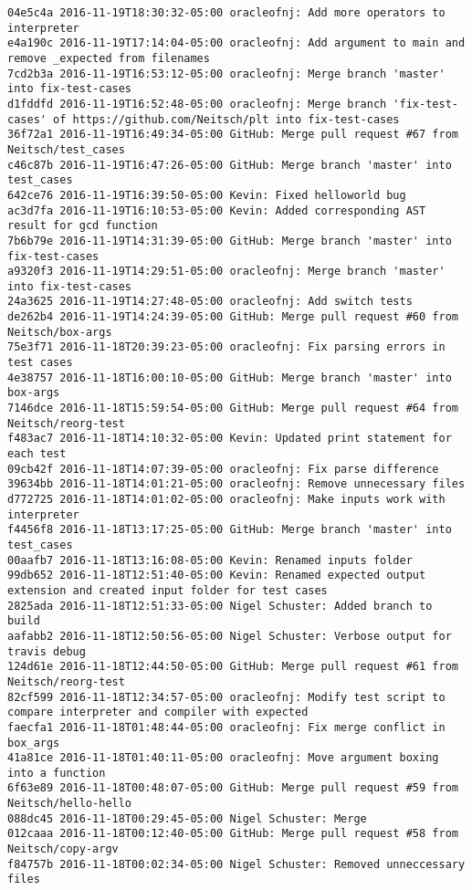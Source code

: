 \begin{lstlisting}
04e5c4a 2016-11-19T18:30:32-05:00 oracleofnj: Add more operators to interpreter
e4a190c 2016-11-19T17:14:04-05:00 oracleofnj: Add argument to main and remove _expected from filenames
7cd2b3a 2016-11-19T16:53:12-05:00 oracleofnj: Merge branch 'master' into fix-test-cases
d1fddfd 2016-11-19T16:52:48-05:00 oracleofnj: Merge branch 'fix-test-cases' of https://github.com/Neitsch/plt into fix-test-cases
36f72a1 2016-11-19T16:49:34-05:00 GitHub: Merge pull request #67 from Neitsch/test_cases
c46c87b 2016-11-19T16:47:26-05:00 GitHub: Merge branch 'master' into test_cases
642ce76 2016-11-19T16:39:50-05:00 Kevin: Fixed helloworld bug
ac3d7fa 2016-11-19T16:10:53-05:00 Kevin: Added corresponding AST result for gcd function
7b6b79e 2016-11-19T14:31:39-05:00 GitHub: Merge branch 'master' into fix-test-cases
a9320f3 2016-11-19T14:29:51-05:00 oracleofnj: Merge branch 'master' into fix-test-cases
24a3625 2016-11-19T14:27:48-05:00 oracleofnj: Add switch tests
de262b4 2016-11-19T14:24:39-05:00 GitHub: Merge pull request #60 from Neitsch/box-args
75e3f71 2016-11-18T20:39:23-05:00 oracleofnj: Fix parsing errors in test cases
4e38757 2016-11-18T16:00:10-05:00 GitHub: Merge branch 'master' into box-args
7146dce 2016-11-18T15:59:54-05:00 GitHub: Merge pull request #64 from Neitsch/reorg-test
f483ac7 2016-11-18T14:10:32-05:00 Kevin: Updated print statement for each test
09cb42f 2016-11-18T14:07:39-05:00 oracleofnj: Fix parse difference
39634bb 2016-11-18T14:01:21-05:00 oracleofnj: Remove unnecessary files
d772725 2016-11-18T14:01:02-05:00 oracleofnj: Make inputs work with interpreter
f4456f8 2016-11-18T13:17:25-05:00 GitHub: Merge branch 'master' into test_cases
00aafb7 2016-11-18T13:16:08-05:00 Kevin: Renamed inputs folder
99db652 2016-11-18T12:51:40-05:00 Kevin: Renamed expected output extension and created input folder for test cases
2825ada 2016-11-18T12:51:33-05:00 Nigel Schuster: Added branch to build
aafabb2 2016-11-18T12:50:56-05:00 Nigel Schuster: Verbose output for travis debug
124d61e 2016-11-18T12:44:50-05:00 GitHub: Merge pull request #61 from Neitsch/reorg-test
82cf599 2016-11-18T12:34:57-05:00 oracleofnj: Modify test script to compare interpreter and compiler with expected
faecfa1 2016-11-18T01:48:44-05:00 oracleofnj: Fix merge conflict in box_args
41a81ce 2016-11-18T01:40:11-05:00 oracleofnj: Move argument boxing into a function
6f63e89 2016-11-18T00:48:07-05:00 GitHub: Merge pull request #59 from Neitsch/hello-hello
088dc45 2016-11-18T00:29:45-05:00 Nigel Schuster: Merge
012caaa 2016-11-18T00:12:40-05:00 GitHub: Merge pull request #58 from Neitsch/copy-argv
f84757b 2016-11-18T00:02:34-05:00 Nigel Schuster: Removed unneccessary files

\end{lstlisting}
